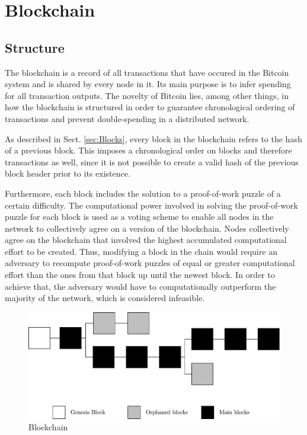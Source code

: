 \section{Blockchain} \label{sec:Blockchain}

\subsection{Structure} \label{sec:BlockchainStructure}
The blockchain is a record of all transactions that have occured in the Bitcoin system and is shared by every node in it. Its main purpose is to infer spending for all transaction outputs. The novelty of Bitcoin lies, among other things, in how the blockchain is structured in order to guarantee chronological ordering of transactions and prevent double-spending in a distributed network.

As described in Sect. \ref{sec:Blocks}, every block in the blockchain refers to the hash of a previous block. This imposes a chronological order on blocks and therefore transactions as well, since it is not possible to create a valid hash of the previous block header prior to its existence.

Furthermore, each block includes the solution to a proof-of-work puzzle of a certain difficulty. The computational power involved in solving the proof-of-work puzzle for each block is used as a voting scheme to enable all nodes in the network to collectively agree on a version of the blockchain. Nodes collectively agree on the blockchain that involved the highest accumulated computational effort to be created. Thus, modifying a block in the chain would require an adversary to recompute proof-of-work puzzles of equal or greater computational effort than the ones from that block up until the newest block. In order to achieve that, the adversary would have to computationally outperform the majority of the network, which is considered infeasible.
\begin{figure}[ht!]
 \centering
 \includegraphics[scale=0.6]{images/Blockchain.pdf}
 \caption{Blockchain}
 \label{figure:Blockchain}
\end{figure}

